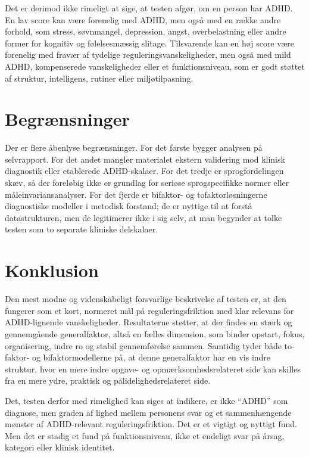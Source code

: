 \documentclass[11pt,a4paper]{article}
\begin{document}
Det er derimod ikke rimeligt at sige, at testen afgør, om en person har ADHD. En lav score kan være forenelig med ADHD, men også med en række andre forhold, som stress, søvnmangel, depression, angst, overbelastning eller andre former for kognitiv og følelsesmæssig slitage. Tilsvarende kan en høj score være forenelig med fravær af tydelige reguleringsvanskeligheder, men også med mild ADHD, kompenserede vanskeligheder eller et funktionsniveau, som er godt støttet af struktur, intelligens, rutiner eller miljøtilpasning.

\section{Begrænsninger}
Der er flere åbenlyse begrænsninger. For det første bygger analysen på selvrapport. For det andet mangler materialet ekstern validering mod klinisk diagnostik eller etablerede ADHD-skalaer. For det tredje er sprogfordelingen skæv, så der foreløbig ikke er grundlag for seriøse sprogspecifikke normer eller måleinvariansanalyser. For det fjerde er bifaktor- og tofaktorløsningerne diagnostiske modeller i metodisk forstand; de er nyttige til at forstå datastrukturen, men de legitimerer ikke i sig selv, at man begynder at tolke testen som to separate kliniske delskalaer.

\section{Konklusion}
Den mest modne og videnskabeligt forsvarlige beskrivelse af testen er, at den fungerer som et kort, normeret mål på reguleringsfriktion med klar relevans for ADHD-lignende vanskeligheder. Resultaterne støtter, at der findes en stærk og gennemgående generalfaktor, altså en fælles dimension, som binder opstart, fokus, organisering, indre ro og stabil gennemførelse sammen. Samtidig tyder både to-faktor- og bifaktormodellerne på, at denne generalfaktor har en vis indre struktur, hvor en mere indre opgave- og opmærksomhedsrelateret side kan skilles fra en mere ydre, praktisk og pålidelighedsrelateret side.

Det, testen derfor med rimelighed kan siges at indikere, er ikke ``ADHD'' som diagnose, men graden af lighed mellem personens svar og et sammenhængende mønster af ADHD-relevant reguleringsfriktion. Det er et vigtigt og nyttigt fund. Men det er stadig et fund på funktionsniveau, ikke et endeligt svar på årsag, kategori eller klinisk identitet.

\printbibliography
\end{document}
